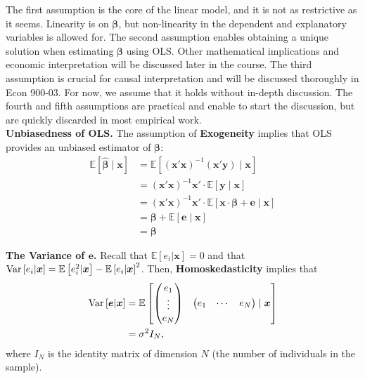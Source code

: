 \noindent The first assumption is the core of the linear model, and it is not as restrictive as it seems. Linearity is on $\bm{\beta}$, but non-linearity in the dependent and explanatory variables is allowed for. The second assumption enables obtaining a unique solution when estimating $\bm{\beta}$ using OLS. Other mathematical implications and economic interpretation will be discussed later in the course. The third assumption is crucial for causal interpretation and will be discussed thoroughly in Econ 900-03. For now, we assume that it holds without in-depth discussion. The fourth and fifth assumptions are practical and enable to start the discussion, but are quickly discarded in most empirical work.\\ 

\noindent \textbf{Unbiasedness of OLS.} The assumption of \textbf{Exogeneity} implies that OLS provides an unbiased estimator of $\bm{\beta}$: 
\begin{align}
	\mathbb{E} \left[ \hat{\bm{\beta}} \mid \bm{x} \right] &= \mathbb{E} \left[ {\left( \bm{x}' \bm{x} \right)}^{-1} \left( \bm{x}' \bm{y} \right) \mid \bm{x} \right]  \nonumber \\
	& = {\left( \bm{x}' \bm{x} \right)}^{-1} \bm{x}' \cdot \mathbb{E} \left[ \bm{y} \mid \bm{x} \right] \nonumber \\
	& = {\left( \bm{x}' \bm{x} \right)}^{-1} \bm{x}' \cdot \mathbb{E} \left[ \bm{x} \cdot \bm{\beta} + \bm{e} \mid \bm{x} \right] \nonumber \\
	& = \bm{\beta} +  \mathbb{E} \left[\bm{e} \mid \bm{x} \right] \nonumber \\ 
	& = \bm{\beta}
\end{align}

\noindent \textbf{The Variance of $\bm{e}$.} Recall that $\mathbb{E} \left[ e_{i} | \bm{x} \right] = 0$ and that $\operatorname{Var} \left[ e_{i} | \bm{x} \right] = \mathbb{E} \left[ e_{i}^2 | \bm{x} \right] - {\mathbb{E} \left[ e_{i} | \bm{x} \right]}^2 $. Then, \textbf{Homoskedasticity} implies that  
\begin{align}
\operatorname{Var} \left[ \bm{e} | \bm{x} \right] &= \mathbb{E} \begin{bmatrix}
 													\begin{pmatrix}
 													 	e_{1} \\ 
 													 	\vdots \\ 
 													 	e_{N}	
 													\end{pmatrix} &
													\begin{pmatrix}
														e_{1} & \cdots & e_{N}	
													\end{pmatrix} \mid \bm{x}
 									  			 \end{bmatrix} \nonumber \\
 									&= \sigma^2 I_{N}, 
\end{align}
\noindent where $I_{N}$ is the identity matrix of dimension $N$ (the number of individuals in the sample).\\

